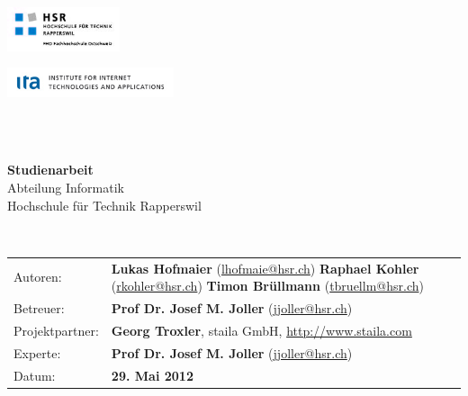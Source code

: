 \begin{titlepage}
\begin{flushleft}

\noindent\begin{minipage}[t]{0.49\textwidth}
	\begin{flushleft}
		\vspace{0pt} %
		\includegraphics[width=125px]{images_Logo/hsrlogo.jpg}
	\end{flushleft}
\end{minipage}
\hfill
\begin{minipage}[t]{0.49\textwidth}
	\begin{flushright}
		\vspace{0pt} %
		\includegraphics[width=185px]{images_Logo/italogo.jpg}
	\end{flushright}
\end{minipage}
\\[1.5cm]

\\[1.5cm]

\begin{center}
{\Large \bfseries Studienarbeit}\\[0.5cm]
{\Large
	Abteilung Informatik \\[0.2cm]
	Hochschule für Technik Rapperswil
}\\[1.5cm]
\end{center}

\\[1.5cm]

\begin{tabular}{lp{12cm}}
Autoren: & \textbf{Lukas Hofmaier} (\url{lhofmaie@hsr.ch}) \newline
 \textbf{Raphael Kohler} (\url{rkohler@hsr.ch}) \newline 
 \textbf{Timon Brüllmann} (\url{tbruellm@hsr.ch}) \\ 
Betreuer: & \textbf{Prof Dr. Josef M. Joller} (\url{jjoller@hsr.ch}) \\ 
Projektpartner: & \textbf{Georg Troxler}, staila GmbH, \url{http://www.staila.com} \\ 
Experte: & \textbf{Prof Dr. Josef M. Joller} (\url{jjoller@hsr.ch}) \\ 
Datum: & \textbf{29. Mai 2012} \\ 
\end{tabular}


\end{flushleft}
\end{titlepage}
